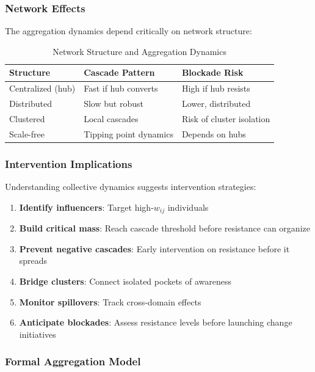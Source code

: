 \subsubsection{Network Effects}

The aggregation dynamics depend critically on network structure:

\begin{table}[htbp]
\centering
\caption{Network Structure and Aggregation Dynamics}
\label{tab:network-effects}
\begin{tabular}{@{}lll@{}}
\toprule
\textbf{Structure} & \textbf{Cascade Pattern} & \textbf{Blockade Risk} \\
\midrule
Centralized (hub) & Fast if hub converts & High if hub resists \\
Distributed & Slow but robust & Lower, distributed \\
Clustered & Local cascades & Risk of cluster isolation \\
Scale-free & Tipping point dynamics & Depends on hubs \\
\bottomrule
\end{tabular}
\end{table}

\subsubsection{Intervention Implications}

Understanding collective dynamics suggests intervention strategies:

\begin{enumerate}
    \item \textbf{Identify influencers}: Target high-$w_{ij}$ individuals
    \item \textbf{Build critical mass}: Reach cascade threshold before 
          resistance can organize
    \item \textbf{Prevent negative cascades}: Early intervention on 
          resistance before it spreads
    \item \textbf{Bridge clusters}: Connect isolated pockets of awareness
    \item \textbf{Monitor spillovers}: Track cross-domain effects
    \item \textbf{Anticipate blockades}: Assess resistance levels before 
          launching change initiatives
\end{enumerate}

\subsubsection{Formal Aggregation Model}


